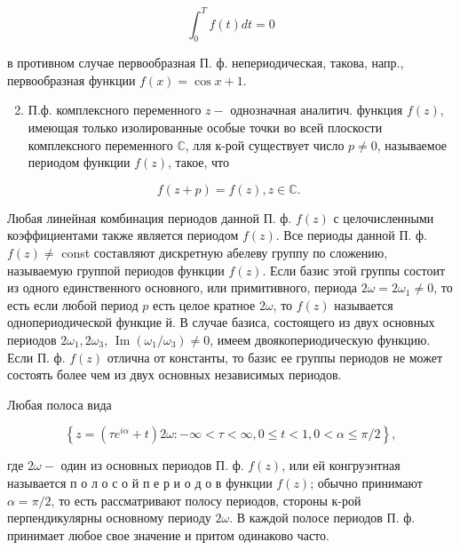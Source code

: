 \documentclass[10pt]{article}
\begin{document}
\[

\int_{0}^{T} f(t) d t=0

\]



в противном случае первообразная П. ф. непериодическая, такова, напр., первообразная функции $f(x)=\cos x+1$.



\begin{enumerate}

  \setcounter{enumi}{1}

  \item П.ф. комплексного переменного $z-$ однозначная аналитич. функция $f(z)$, имеющая только изолированные особые точки во всей плоскости комплексного переменного $\mathbb{C}$, лля к-рой существует число $p \neq 0$, называемое периодом функции $f(z)$, такое, что

\end{enumerate}



\[

f(z+p)=f(z), z \in \mathbb{C} \text {. }

\]



Любая линейная комбинация периодов данной П. ф. $f(z)$ с целочисленными коэффициентами также является периодом $f(z)$. Все периоды данной П. ф. $f(z) \neq$ const составляют дискретную абелеву группу по сложению, называемую группой периодов функции $f(z)$. Если базис этой группы состоит из одного единственного основного, или примитивного, периода $2 \omega=2 \omega_{1} \neq 0$, то есть если любой период $p$ есть целое кратное $2 \omega$, то $f(z)$ называется однопериодической функцие й. В случае базиса, состоящего из двух основных периодов $2 \omega_{1}, 2 \omega_{3}$, $\operatorname{Im}\left(\omega_{1} / \omega_{3}\right) \neq 0$, имеем двоякопериодическую функцию. Если П. ф. $f(z)$ отлична от константы, то базис ее группы периодов не может состоять более чем из двух основных независимых периодов.



Любая полоса вида



\[

\left\{z=\left(\tau e^{i \alpha}+t\right) 2 \omega:-\infty<\tau<\infty, 0 \leqslant t<1,0<\alpha \leqslant \pi / 2\right\},

\]



где $2 \omega-$ один из основных периодов П. ф. $f(z)$, или ей конгруэнтная называется п о л о с о й п е р и о д о в функции $f(z)$; обычно принимают $\alpha=\pi / 2$, то есть рассматривают полосу периодов, стороны к-рой перпендикулярны основному периоду $2 \omega$. В каждой полосе периодов П. ф. принимает любое свое значение и притом одинаково часто.
\end{document}
